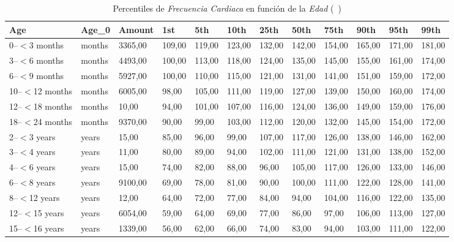 \newpage
\thispagestyle{empty}
\begin{landscape}
    \begin{table}[htbp]
        \centering
        \caption{Percentiles de \textit{Frecuencia Cardiaca} en función de la \textit{Edad} (~\cite{percentilesFenton2015})}
        \label{tabla:age_percentiles}
        \begin{tabular}{|l|l|l|l|l|l|l|l|l|l|l|l|}
            \toprule
            Age & Age\_0 & {Amount} & {1st} & {5th} & {10th} & {25th} & {50th} & {75th} & {90th} & {95th} & {99th} \\
            \midrule
            0--$<$3 months & months & 3365,00 & 109,00 & 119,00 & 123,00 & 132,00 & 142,00 & 154,00 & 165,00 & 171,00 & 181,00 \\
            3--$<$6 months & months & 4493,00 & 100,00 & 113,00 & 118,00 & 124,00 & 135,00 & 145,00 & 155,00 & 161,00 & 174,00 \\
            6--$<$9 months & months & 5927,00 & 100,00 & 110,00 & 115,00 & 121,00 & 131,00 & 141,00 & 151,00 & 159,00 & 172,00 \\
            10--$<$12 months & months & 6005,00 & 98,00 & 105,00 & 111,00 & 119,00 & 127,00 & 139,00 & 150,00 & 160,00 & 174,00 \\
            12--$<$18 months & months & 10,00 & 94,00 & 101,00 & 107,00 & 116,00 & 124,00 & 136,00 & 149,00 & 159,00 & 176,00 \\
            18--$<$24 months & months & 9370,00 & 90,00 & 99,00 & 103,00 & 112,00 & 120,00 & 132,00 & 145,00 & 154,00 & 172,00 \\
            2--$<$3 years & years & 15,00 & 85,00 & 96,00 & 99,00 & 107,00 & 117,00 & 126,00 & 138,00 & 146,00 & 162,00 \\
            3--$<$4 years & years & 11,00 & 80,00 & 89,00 & 94,00 & 102,00 & 111,00 & 121,00 & 131,00 & 138,00 & 152,00 \\
            4--$<$6 years & years & 15,00 & 74,00 & 82,00 & 88,00 & 96,00 & 105,00 & 117,00 & 126,00 & 133,00 & 146,00 \\
            6--$<$8 years & years & 9100,00 & 69,00 & 78,00 & 81,00 & 90,00 & 100,00 & 111,00 & 122,00 & 128,00 & 141,00 \\
            8--$<$12 years & years & 12,00 & 64,00 & 72,00 & 77,00 & 84,00 & 94,00 & 104,00 & 116,00 & 122,00 & 135,00 \\
            12--$<$15 years & years & 6054,00 & 59,00 & 64,00 & 69,00 & 77,00 & 86,00 & 97,00 & 106,00 & 113,00 & 127,00 \\
            15--$<$16 years & years & 1339,00 & 56,00 & 62,00 & 66,00 & 74,00 & 83,00 & 94,00 & 103,00 & 111,00 & 122,00 \\
            \bottomrule
        \end{tabular}
    \end{table}
\end{landscape}
\restoregeometry 

